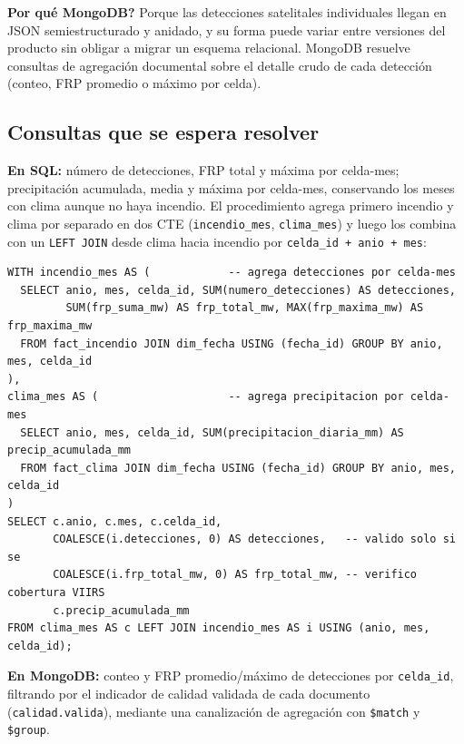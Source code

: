 \documentclass[11pt,a4paper]{article}
\begin{document}
\textbf{\textquestiondown Por qu\'e MongoDB?} Porque las detecciones satelitales individuales llegan en JSON semiestructurado y anidado, y su forma puede variar entre versiones del producto sin obligar a migrar un esquema relacional. MongoDB resuelve consultas de agregaci\'on documental sobre el detalle crudo de cada detecci\'on (conteo, FRP promedio o m\'aximo por celda).

\subsection{Consultas que se espera resolver}
\footnotesize
\textbf{En SQL:} n\'umero de detecciones, FRP total y m\'axima por celda-mes; precipitaci\'on acumulada, media y m\'axima por celda-mes, conservando los meses con clima aunque no haya incendio. El procedimiento agrega primero incendio y clima por separado en dos CTE (\texttt{incendio\_mes}, \texttt{clima\_mes}) y luego los combina con un \texttt{LEFT JOIN} desde clima hacia incendio por \texttt{celda\_id + anio + mes}:

\begin{scriptsize}
\begin{verbatim}
WITH incendio_mes AS (            -- agrega detecciones por celda-mes
  SELECT anio, mes, celda_id, SUM(numero_detecciones) AS detecciones,
         SUM(frp_suma_mw) AS frp_total_mw, MAX(frp_maxima_mw) AS frp_maxima_mw
  FROM fact_incendio JOIN dim_fecha USING (fecha_id) GROUP BY anio, mes, celda_id
),
clima_mes AS (                    -- agrega precipitacion por celda-mes
  SELECT anio, mes, celda_id, SUM(precipitacion_diaria_mm) AS precip_acumulada_mm
  FROM fact_clima JOIN dim_fecha USING (fecha_id) GROUP BY anio, mes, celda_id
)
SELECT c.anio, c.mes, c.celda_id,
       COALESCE(i.detecciones, 0) AS detecciones,   -- valido solo si se
       COALESCE(i.frp_total_mw, 0) AS frp_total_mw, -- verifico cobertura VIIRS
       c.precip_acumulada_mm
FROM clima_mes AS c LEFT JOIN incendio_mes AS i USING (anio, mes, celda_id);
\end{verbatim}
\end{scriptsize}

\textbf{En MongoDB:} conteo y FRP promedio/m\'aximo de detecciones por \texttt{celda\_id}, filtrando por el indicador de calidad validada de cada documento (\texttt{calidad.valida}), mediante una canalizaci\'on de agregaci\'on con \texttt{\$match} y \texttt{\$group}.
\normalsize

\end{document}
